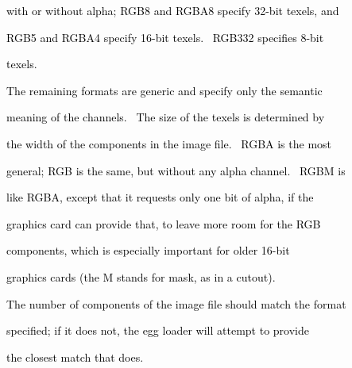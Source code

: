 \documentclass[a4paper]{article}
\newcommand\textstyleOOoComputerKeyWord[1]{\textrm{\textcolor[rgb]{0.0,0.0,0.5019608}{#1}}}
\begin{document}
{\color{black}
\textstyleOOoComputerKeyWord{\textcolor{black}{\ \ \ \ with or without alpha; RGB8 and RGBA8 specify 32-bit texels,
and}}}

{\color{black}
\textstyleOOoComputerKeyWord{\textcolor{black}{\ \ \ \ RGB5 and RGBA4 specify 16-bit texels. \ RGB332 specifies 8-bit}}}

{\color{black}
\textstyleOOoComputerKeyWord{\textcolor{black}{\ \ \ \ texels.}}}


\bigskip

{\color{black}
\textstyleOOoComputerKeyWord{\textcolor{black}{\ \ \ \ The remaining formats are generic and specify only the
semantic}}}

{\color{black}
\textstyleOOoComputerKeyWord{\textcolor{black}{\ \ \ \ meaning of the channels. \ The size of the texels is determined
by}}}

{\color{black}
\textstyleOOoComputerKeyWord{\textcolor{black}{\ \ \ \ the width of the components in the image file. \ RGBA is the
most}}}

{\color{black}
\textstyleOOoComputerKeyWord{\textcolor{black}{\ \ \ \ general; RGB is the same, but without any alpha channel. \ RGBM
is}}}

{\color{black}
\textstyleOOoComputerKeyWord{\textcolor{black}{\ \ \ \ like RGBA, except that it requests only one bit of alpha, if
the}}}

{\color{black}
\textstyleOOoComputerKeyWord{\textcolor{black}{\ \ \ \ graphics card can provide that, to leave more room for the RGB}}}

{\color{black}
\textstyleOOoComputerKeyWord{\textcolor{black}{\ \ \ \ components, which is especially important for older 16-bit}}}

{\color{black}
\textstyleOOoComputerKeyWord{\textcolor{black}{\ \ \ \ graphics cards (the {\textquotedbl}M{\textquotedbl} stands for
{\textquotedbl}mask{\textquotedbl}, as in a cutout).}}}


\bigskip

{\color{black}
\textstyleOOoComputerKeyWord{\textcolor{black}{\ \ \ \ The number of components of the image file should match the
format}}}

{\color{black}
\textstyleOOoComputerKeyWord{\textcolor{black}{\ \ \ \ specified; if it does not, the egg loader will attempt to
provide}}}

{\color{black}
\textstyleOOoComputerKeyWord{\textcolor{black}{\ \ \ \ the closest match that does.}}}


\bigskip
\end{document}
